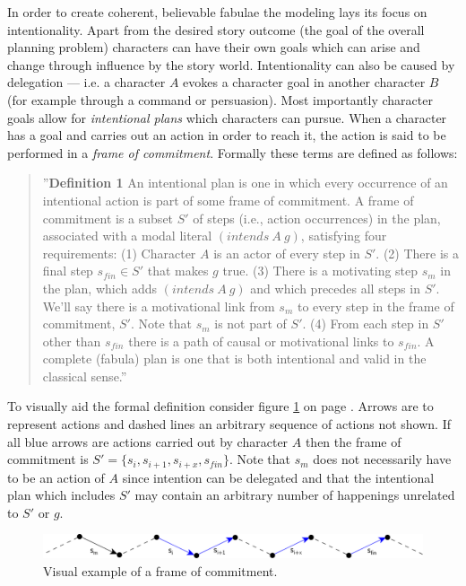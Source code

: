 In order to create coherent, believable fabulae the modeling lays its focus on intentionality. Apart from the desired story outcome (the goal of the overall planning problem) characters can have their own goals which can arise and change through influence by the story world. Intentionality can also be caused by delegation --- i.e. a character $A$ evokes a character goal in another character $B$ (for example through a command or persuasion). Most importantly character goals allow for \emph{intentional plans} which characters can pursue. When a character has a goal and carries out an action in order to reach it, the action is said to be performed in a \emph{frame of commitment}. Formally these terms are defined as follows:
\begin{quote}
''\textbf{Definition 1} An intentional plan is one in which every occurrence of an intentional action is part of some frame of commitment. A frame of commitment is a subset $S'$ of steps (i.e., action occurrences) in the plan, associated with a modal literal $(intends\ A\ g)$, satisfying four requirements: (1) Character $A$ is an actor of every step in $S'$. (2) There is a final step $s_{fin}\in S'$ that makes $g$ true. (3) There is a motivating step $s_m$ in the plan, which adds $(intends\ A\ g)$ and which precedes all steps in $S'$. We’ll say there is a motivational link from $s_m$ to every step in the frame of commitment, $S'$. Note that $s_m$ is not part of $S'$. (4) From each step in $S'$ other than $s_{fin}$ there is a path of causal or motivational links to $s_{fin}$. A complete (fabula) plan is one that is both intentional and valid in the classical sense.'' \cite{Haslum14}
\end{quote}
To visually aid the formal definition consider figure \ref{fig:intplan} on page \pageref{fig:intplan}. Arrows are to represent actions and dashed lines an arbitrary sequence of actions not shown. If all blue arrows are actions carried out by character $A$ then the frame of commitment is $S'=\{s_i,s_{i+1},s_{i+x},s_{fin}\}$. Note that $s_m$ does not necessarily have to be an action of $A$ since intention can be delegated and that the intentional plan which includes $S'$ may contain an arbitrary number of happenings unrelated to $S'$ or $g$.
\begin{figure}[htbp]
 \centering
 \includegraphics[scale=0.8]{intentional_plan}
 \caption{Visual example of a frame of commitment.}
 \label{fig:intplan}
\end{figure}

